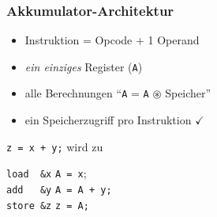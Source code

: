 \documentclass[t,aspectratio=169,usenames,dvipsnames]{beamer}
\begin{document}





\begin{frame}
  \frametitle{Akkumulator-Architektur}

  \begin{itemize}
  \item Instruktion = Opcode + 1 Operand
  \item \emph{ein einziges} Register (\texttt{A})
  \item alle Berechnungen \enquote{\texttt{A} = \texttt{A} $\circledast$ Speicher}
  \item ein Speicherzugriff pro Instruktion $\checkmark$
  \end{itemize}

  \bigskip

  \texttt{z = x + y;} wird zu

  \bigskip

  {\Large
    \texttt{load~~\&x} \qquad \texttt{A = x};\\
    \texttt{add~~~\&y} \qquad \texttt{A = A + y;}\\
    \texttt{store~\&z} \qquad \texttt{z = A;}\\
  }
\end{frame}
\end{document}
